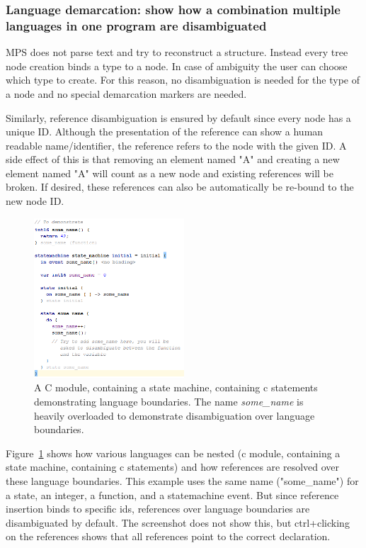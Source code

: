 \documentclass[preprint,numbers,10pt]{sigplanconf}
\begin{document}
\subsubsection{Language demarcation: show how a combination multiple languages in one program are disambiguated}
MPS does not parse text and try to reconstruct a structure. Instead every tree node creation binds a type to a node. In case of ambiguity the user can choose which type to create. For this reason, no disambiguation is needed for the type of a node and no special demarcation markers are needed.

Similarly, reference disambiguation is ensured by default since every node has a unique ID. Although the presentation of the reference can show a human readable name/identifier, the reference refers to the node with the given ID. A side effect of this is that removing an element named "A" and creating a new element named "A" will count as a new node and existing references will be broken. If desired, these references can also be automatically be re-bound to the new node ID.

\begin{figure}[H]
	\centering
	\includegraphics[width=0.5\textwidth]{screens/LanguageDemarcationAndAmbiguity.png}
	\caption{A C module, containing a state machine, containing c statements demonstrating language boundaries. The name \emph{some\_name} is heavily overloaded to demonstrate disambiguation over language boundaries.}
	\label{fig:LanguageDemarcationAndAmbiguity}
\end{figure}

Figure~\ref{fig:LanguageDemarcationAndAmbiguity} shows how various languages can be nested (c module, containing a state machine, containing c statements) and how references are resolved over these language boundaries. This example uses the same name ("some\_name") for a state, an integer, a function, and a statemachine event. But since reference insertion binds to specific ids, references over language boundaries are disambiguated by default. The screenshot does not show this, but ctrl+clicking on the references shows that all references point to the correct declaration.
\end{document}

